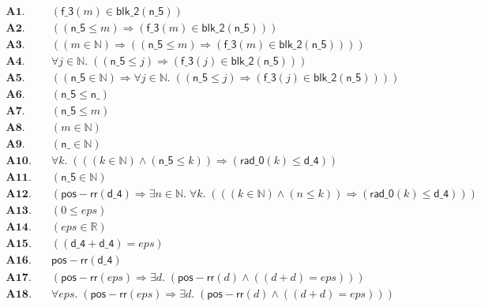 \documentclass[11pt]{article}
\begin{document}
\begin{align*}
  \mathbf{A1.}\quad & (\mathsf{f\_3}(m) \in \mathsf{blk\_2}(\mathsf{n\_5})) \\
  \mathbf{A2.}\quad & ((\mathsf{n\_5} \leq m) \Rightarrow (\mathsf{f\_3}(m) \in \mathsf{blk\_2}(\mathsf{n\_5}))) \\
  \mathbf{A3.}\quad & ((m \in \mathbb{N}) \Rightarrow ((\mathsf{n\_5} \leq m) \Rightarrow (\mathsf{f\_3}(m) \in \mathsf{blk\_2}(\mathsf{n\_5})))) \\
  \mathbf{A4.}\quad & \forall j \in \mathbb{N}.\; ((\mathsf{n\_5} \leq j) \Rightarrow (\mathsf{f\_3}(j) \in \mathsf{blk\_2}(\mathsf{n\_5}))) \\
  \mathbf{A5.}\quad & ((\mathsf{n\_5} \in \mathbb{N}) \Rightarrow \forall j \in \mathbb{N}.\; ((\mathsf{n\_5} \leq j) \Rightarrow (\mathsf{f\_3}(j) \in \mathsf{blk\_2}(\mathsf{n\_5})))) \\
  \mathbf{A6.}\quad & (\mathsf{n\_5} \leq \mathsf{n\_}) \\
  \mathbf{A7.}\quad & (\mathsf{n\_5} \leq m) \\
  \mathbf{A8.}\quad & (m \in \mathbb{N}) \\
  \mathbf{A9.}\quad & (\mathsf{n\_} \in \mathbb{N}) \\
  \mathbf{A10.}\quad & \forall k.\; (((k \in \mathbb{N}) \wedge (\mathsf{n\_5} \leq k)) \Rightarrow (\mathsf{rad\_0}(k) \leq \mathsf{d\_4})) \\
  \mathbf{A11.}\quad & (\mathsf{n\_5} \in \mathbb{N}) \\
  \mathbf{A12.}\quad & (\mathsf{pos{-}rr}(\mathsf{d\_4}) \Rightarrow \exists n \in \mathbb{N}.\; \forall k.\; (((k \in \mathbb{N}) \wedge (n \leq k)) \Rightarrow (\mathsf{rad\_0}(k) \leq \mathsf{d\_4}))) \\
  \mathbf{A13.}\quad & (0 \leq \mathit{eps}) \\
  \mathbf{A14.}\quad & (\mathit{eps} \in \mathbb{R}) \\
  \mathbf{A15.}\quad & ((\mathsf{d\_4} + \mathsf{d\_4}) = \mathit{eps}) \\
  \mathbf{A16.}\quad & \mathsf{pos{-}rr}(\mathsf{d\_4}) \\
  \mathbf{A17.}\quad & (\mathsf{pos{-}rr}(\mathit{eps}) \Rightarrow \exists d.\; (\mathsf{pos{-}rr}(d) \wedge ((d + d) = \mathit{eps}))) \\
  \mathbf{A18.}\quad & \forall \mathit{eps}.\; (\mathsf{pos{-}rr}(\mathit{eps}) \Rightarrow \exists d.\; (\mathsf{pos{-}rr}(d) \wedge ((d + d) = \mathit{eps}))) \\

\end{align*}
\end{document}
